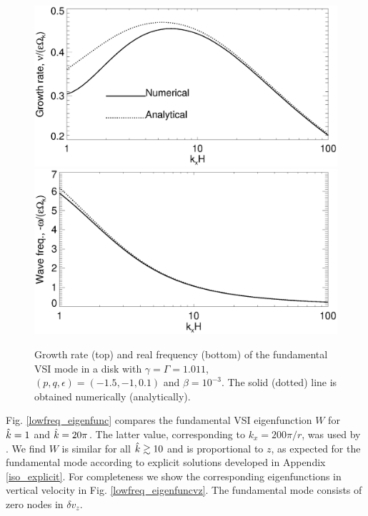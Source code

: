 \begin{figure}
  \includegraphics[width=\linewidth,clip=true,trim=0cm 1.75cm 0cm
  0cm]{figures/compare_eigen_imag_iso} 
  \includegraphics[width=\linewidth,clip=true,trim=0cm 0cm 0cm
  1cm]{figures/compare_eigen_real_iso}
  \caption{Growth rate (top) and real frequency (bottom) of the
    fundamental VSI mode in a disk with $\gamma=\Gamma=1.011$,
    $(p,q,\epsilon)=(-1.5,-1,0.1)$ and
    $\beta=10^{-3}$. The solid (dotted) line is obtained numerically
    (analytically).  
    \label{iso_eigen_kx} 
  }
\end{figure}

Fig. \ref{lowfreq_eigenfunc} compares the fundamental VSI eigenfunction
$W$ for $\hat{k}=1$ and $\hat{k}=20\pi$. The latter value, corresponding
to $k_x= 200\pi/r$, was used by \cite{mcnally14}. We find $W$ is
similar for all $\hat{k}\gtrsim10$ and is proportional to $z$, as
expected for the fundamental mode according to explicit solutions
developed in Appendix \ref{iso_explicit}. For completeness we show the
corresponding eigenfunctions in vertical velocity in
Fig. \ref{lowfreq_eigenfuncvz}. The fundamental mode
consists of zero nodes in $\delta v_z$. 


